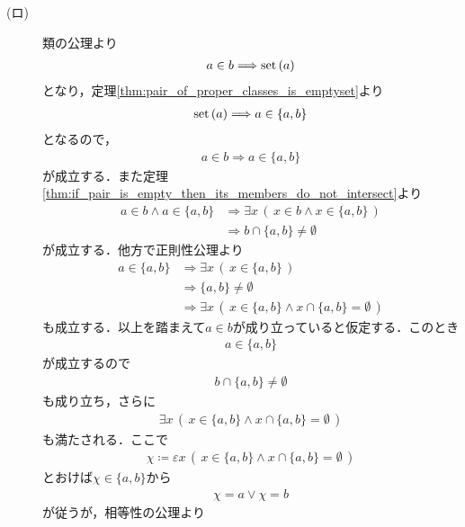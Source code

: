 \begin{prf}
\begin{description}
			\item[(ロ)]
				類の公理より
				\begin{align}
					a \in b \Longrightarrow \operatorname*{set} \left(a\right)
				\end{align}
				となり，定理\ref{thm:pair_of_proper_classes_is_emptyset}より
				\begin{align}
					\operatorname*{set} \left(a\right) \Longrightarrow a \in \{a,b\}
				\end{align}
				となるので，
				\begin{align}
					a \in b \Longrightarrow a \in \{a,b\}
				\end{align}
				が成立する．また定理\ref{thm:if_pair_is_empty_then_its_members_do_not_intersect}より
				\begin{align}
					a \in b \wedge a \in \{a,b\} 
					&\Longrightarrow \exists x\, \left(\, x \in b \wedge x \in \{a,b\}\, \right) \\
					&\Longrightarrow b \cap \{a,b\} \neq \emptyset
				\end{align}
				が成立する．他方で正則性公理より
				\begin{align}
					a \in \{a,b\} &\Longrightarrow \exists x\, \left(\, x \in \{a,b\}\, \right) \\
					&\Longrightarrow \{a,b\} \neq \emptyset \\
					&\Longrightarrow \exists x\, \left(\, x \in \{a,b\} \wedge x \cap \{a,b\} = \emptyset\, \right)
				\end{align}
				も成立する．以上を踏まえて$a \in b$が成り立っていると仮定する．このとき
				\begin{align}
					a \in \{a,b\}
				\end{align}
				が成立するので
				\begin{align}
					b \cap \{a,b\} \neq \emptyset
				\end{align}
				も成り立ち，さらに
				\begin{align}
					\exists x\, \left(\, x \in \{a,b\} \wedge x \cap \{a,b\} = \emptyset\, \right)
				\end{align}
				も満たされる．ここで
				\begin{align}
					\chi \coloneqq \varepsilon x\, \left(\, x \in \{a,b\} \wedge x \cap \{a,b\} = \emptyset\, \right)
				\end{align}
				とおけば$\chi \in \{a,b\}$から
				\begin{align}
					\chi = a \vee \chi = b
				\end{align}
				が従うが，相等性の公理より
				\begin{align}

\end{align}
\end{description}
\end{prf}
